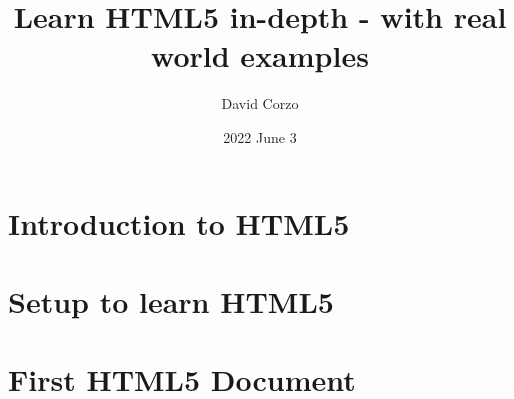 \documentclass[openany]{book}
\title{Learn HTML5 in-depth - with real world examples}
\date{2022 June 3}
\author{David Corzo}
\begin{document}
\maketitle
\tableofcontents

\chapter{Introduction to HTML5}


\chapter{Setup to learn HTML5}


\chapter{First HTML5 Document}


\end{document}
